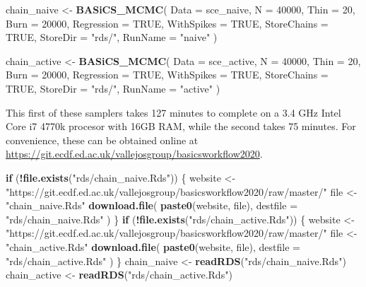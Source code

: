 \documentclass[9pt,a4paper,]{extarticle}
\newenvironment{Shaded}{\begin{snugshade}}{\end{snugshade}}
\newcommand{\ControlFlowTok}[1]{\textcolor[rgb]{0.13,0.29,0.53}{\textbf{#1}}}
\newcommand{\DataTypeTok}[1]{\textcolor[rgb]{0.13,0.29,0.53}{#1}}
\newcommand{\DecValTok}[1]{\textcolor[rgb]{0.00,0.00,0.81}{#1}}
\newcommand{\KeywordTok}[1]{\textcolor[rgb]{0.13,0.29,0.53}{\textbf{#1}}}
\newcommand{\NormalTok}[1]{#1}
\newcommand{\OperatorTok}[1]{\textcolor[rgb]{0.81,0.36,0.00}{\textbf{#1}}}
\newcommand{\OtherTok}[1]{\textcolor[rgb]{0.56,0.35,0.01}{#1}}
\newcommand{\StringTok}[1]{\textcolor[rgb]{0.31,0.60,0.02}{#1}}
\begin{document}
\begin{Shaded}
\begin{Highlighting}[]
\NormalTok{chain_naive <-}\StringTok{ }\KeywordTok{BASiCS_MCMC}\NormalTok{(}
  \DataTypeTok{Data =}\NormalTok{ sce_naive,}
  \DataTypeTok{N =} \DecValTok{40000}\NormalTok{,}
  \DataTypeTok{Thin =} \DecValTok{20}\NormalTok{,}
  \DataTypeTok{Burn =} \DecValTok{20000}\NormalTok{,}
  \DataTypeTok{Regression =} \OtherTok{TRUE}\NormalTok{,}
  \DataTypeTok{WithSpikes =} \OtherTok{TRUE}\NormalTok{,}
  \DataTypeTok{StoreChains =} \OtherTok{TRUE}\NormalTok{,}
  \DataTypeTok{StoreDir =} \StringTok{"rds/"}\NormalTok{,}
  \DataTypeTok{RunName =} \StringTok{"naive"}
\NormalTok{)}

\NormalTok{chain_active <-}\StringTok{ }\KeywordTok{BASiCS_MCMC}\NormalTok{(}
  \DataTypeTok{Data =}\NormalTok{ sce_active,}
  \DataTypeTok{N =} \DecValTok{40000}\NormalTok{,}
  \DataTypeTok{Thin =} \DecValTok{20}\NormalTok{,}
  \DataTypeTok{Burn =} \DecValTok{20000}\NormalTok{,}
  \DataTypeTok{Regression =} \OtherTok{TRUE}\NormalTok{,}
  \DataTypeTok{WithSpikes =} \OtherTok{TRUE}\NormalTok{,}
  \DataTypeTok{StoreChains =} \OtherTok{TRUE}\NormalTok{,}
  \DataTypeTok{StoreDir =} \StringTok{"rds/"}\NormalTok{,}
  \DataTypeTok{RunName =} \StringTok{"active"}
\NormalTok{)}
\end{Highlighting}
\end{Shaded}

This first of these samplers takes 127 minutes to complete on a 3.4 GHz Intel
Core i7 4770k procesor with 16GB RAM, while the second takes 75 minutes.
For convenience, these can be obtained online at
\url{https://git.ecdf.ed.ac.uk/vallejosgroup/basicsworkflow2020}.

\begin{Shaded}
\begin{Highlighting}[]
\ControlFlowTok{if}\NormalTok{ (}\OperatorTok{!}\KeywordTok{file.exists}\NormalTok{(}\StringTok{"rds/chain_naive.Rds"}\NormalTok{)) \{}
\NormalTok{  website <-}\StringTok{ "https://git.ecdf.ed.ac.uk/vallejosgroup/basicsworkflow2020/raw/master/"}
\NormalTok{  file <-}\StringTok{ "chain_naive.Rds"}
  \KeywordTok{download.file}\NormalTok{(}
    \KeywordTok{paste0}\NormalTok{(website, file),}
    \DataTypeTok{destfile =} \StringTok{"rds/chain_naive.Rds"}
\NormalTok{  )  }
\NormalTok{\}}
\ControlFlowTok{if}\NormalTok{ (}\OperatorTok{!}\KeywordTok{file.exists}\NormalTok{(}\StringTok{"rds/chain_active.Rds"}\NormalTok{)) \{}
\NormalTok{  website <-}\StringTok{ "https://git.ecdf.ed.ac.uk/vallejosgroup/basicsworkflow2020/raw/master/"}
\NormalTok{  file <-}\StringTok{ "chain_active.Rds"}
  \KeywordTok{download.file}\NormalTok{(}
    \KeywordTok{paste0}\NormalTok{(website, file),}
    \DataTypeTok{destfile =} \StringTok{"rds/chain_active.Rds"}
\NormalTok{  )  }
\NormalTok{\}}
\NormalTok{chain_naive <-}\StringTok{ }\KeywordTok{readRDS}\NormalTok{(}\StringTok{"rds/chain_naive.Rds"}\NormalTok{)}
\NormalTok{chain_active <-}\StringTok{ }\KeywordTok{readRDS}\NormalTok{(}\StringTok{"rds/chain_active.Rds"}\NormalTok{)}
\end{Highlighting}
\end{Shaded}
\end{document}
